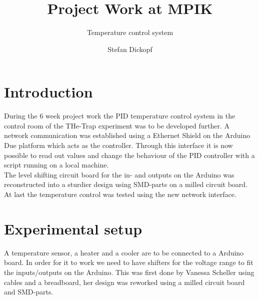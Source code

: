 \documentclass[12pt]{scrartcl}
\begin{document}
  \title{Project Work at MPIK}
  \subtitle{Temperature control system}
  \date{}
  \author{Stefan Dickopf}
  \maketitle

  \section{Introduction}
    During the 6 week project work the PID temperature control system in the
    control room of the THe-Trap experiment was to be developed further. A
    network communication was established using a Ethernet Shield on
    the Arduino Due platform which acts as the controller. Through this
    interface it is now possible to read out values and change the behaviour
    of the PID controller with a script running on a local machine.\\
    The level shifting circuit board for the in- and outputs on the Arduino
    was reconstructed into a sturdier design using SMD-parts on a milled
    circuit board.\\
    At last the temperature control was tested using the new network interface.

  \section{Experimental setup}
    A temperature sensor, a heater and a cooler are to be connected to a Arduino
    board. In order for it to work we need to have shifters for the voltage
    range to fit the inputs/outputs on the Arduino. This was first done by
    Vanessa Scheller using cables and a breadboard, her design was reworked
    using a milled circuit board and SMD-parts.
\end{document}
